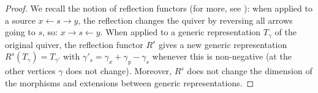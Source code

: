 \documentclass[twoside]{article}
\newcommand{\Hom}{\operatorname{Hom}}
\newcommand{\Ext}{\operatorname{Ext}}
\theoremstyle{definition}
\begin{document}
\begin{proof}

We recall the notion of reflection functors (for more, see \cite{elements}): when applied to a source $x\leftarrow s \rightarrow y$, the reflection changes the quiver by reversing all arrows going to $s$, so: $x\rightarrow s \leftarrow y$. When applied to a generic representation $T_\gamma$ of the original quiver, the reflection functor $R^s$ gives a new generic representation $R^s(T_\gamma)=T_{\gamma'}$ with $\gamma'_s=\gamma_x+\gamma_y-\gamma_s$ whenever this is non-negative (at the other vertices $\gamma$ does not change). Moreover, $R^s$ does not change the dimension of the morphisms and extensions between generic representations.


\end{proof}
\end{document}
